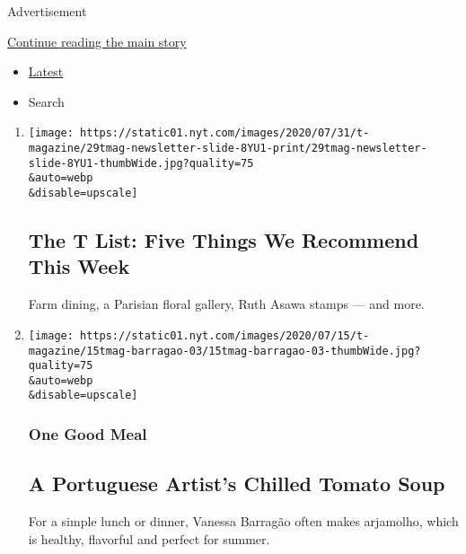 Advertisement

\protect\hyperlink{after-mid1}{Continue reading the main story}

\begin{itemize}
\tightlist
\item
  \protect\hyperlink{stream-panel}{Latest}
\item
  Search
\end{itemize}

\begin{enumerate}
\def\labelenumi{\arabic{enumi}.}
\item
  \href{/2020/07/30/t-magazine/the-t-list-five-things-we-recommend-this-week.html}{}

  \texttt{[image: https://static01.nyt.com/images/2020/07/31/t-magazine/29tmag-newsletter-slide-8YU1-print/29tmag-newsletter-slide-8YU1-thumbWide.jpg?quality=75\\\&auto=webp\\\&disable=upscale]}

  \hypertarget{the-t-list-five-things-we-recommend-this-week}{%
  \subsection{The T List: Five Things We Recommend This
  Week}\label{the-t-list-five-things-we-recommend-this-week}}

  Farm dining, a Parisian floral gallery, Ruth Asawa stamps --- and
  more.
\item
  \href{/2020/07/17/t-magazine/summer-recipes-arjamolho-soup-vanessa-barragao.html}{}

  \texttt{[image: https://static01.nyt.com/images/2020/07/15/t-magazine/15tmag-barragao-03/15tmag-barragao-03-thumbWide.jpg?quality=75\\\&auto=webp\\\&disable=upscale]}

  \hypertarget{one-good-meal-5}{%
  \subsubsection{One Good Meal}\label{one-good-meal-5}}

  \hypertarget{a-portuguese-artists-chilled-tomato-soup}{%
  \subsection{A Portuguese Artist's Chilled Tomato
  Soup}\label{a-portuguese-artists-chilled-tomato-soup}}

  For a simple lunch or dinner, Vanessa Barragão often makes arjamolho,
  which is healthy, flavorful and perfect for summer.


\end{enumerate}
